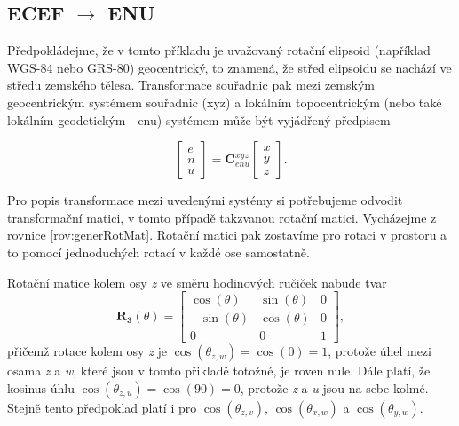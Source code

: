\documentclass[11pt,a4paper]{article}
\begin{document}
\subsection{ECEF $\rightarrow$ ENU}
Předpokládejme, že v tomto příkladu je uvažovaný rotační elipsoid (například WGS-84 nebo GRS-80) geocentrický, to znamená, že střed elipsoidu se nachází ve středu zemského tělesa. Transformace souřadnic pak mezi zemským geocentrickým systémem souřadnic (xyz) a lokálním topocentrickým (nebo také lokálním geodetickým - enu) systémem může být vyjádřený předpisem \cite{Soler1998}

\begin{equation}
\begin{bmatrix}
e \\
n \\
u
\end{bmatrix} = 
\mathbf{C}_{enu}^{xyz}
\begin{bmatrix}
x \\
y \\
z
\end{bmatrix}.
\label{rov:ecef2enu1}
\end{equation}

Pro popis transformace mezi uvedenými systémy si potřebujeme odvodit transformační matici, v tomto případě takzvanou rotační matici. Vycházejme z rovnice \ref{rov:generRotMat}. Rotační matici pak zostavíme pro rotaci v prostoru a to pomocí jednoduchých rotací v každé ose samostatně.

Rotační matice kolem osy \textit{z} ve směru hodinových ručiček nabude tvar
\begin{equation}
\mathbf{R_{3}}\left(\theta\right) = 
\begin{bmatrix}
\cos{\left(\theta\right)} & \sin{\left(\theta\right)} & 0 \\
-\sin{\left(\theta\right)} & \cos{\left(\theta\right)} & 0 \\
0 & 0 & 1
\end{bmatrix},
\end{equation}
přičemž rotace kolem osy \textit{z} je $\cos{\left(\theta_{z, w} \right)} = \cos{\left(0\right)} = 1$, protože úhel mezi osama \textit{z} a \textit{w}, které jsou v tomto přikladě totožné, je roven nule. Dále platí, že kosinus úhlu $ \cos{\left(\theta_{z, u} \right)}= \cos{\left(90\right)} = 0 $, protože \textit {z} a \textit {u} jsou na sebe kolmé. Stejně tento předpoklad platí i pro $\cos{\left(\theta_{z,v}\right)}$, $\cos{\left(\theta_{x,w}\right)}$ a $\cos{\left(\theta_{y,w}\right)}$.
\end{document}
